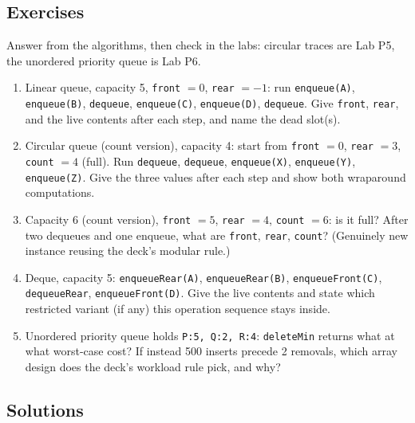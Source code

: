 \documentclass[11pt]{article}
\begin{document}
\subsection*{Exercises}

Answer from the algorithms, then check in the labs: circular traces are Lab P5, the unordered priority queue is Lab P6.
\begin{enumerate}
  \item Linear queue, capacity 5, \texttt{front} $= 0$, \texttt{rear} $= -1$: run \texttt{enqueue(A)}, \texttt{enqueue(B)}, \texttt{dequeue}, \texttt{enqueue(C)}, \texttt{enqueue(D)}, \texttt{dequeue}. Give \texttt{front}, \texttt{rear}, and the live contents after each step, and name the dead slot(s).
  \item Circular queue (count version), capacity 4: start from \texttt{front} $= 0$, \texttt{rear} $= 3$, \texttt{count} $= 4$ (full). Run \texttt{dequeue}, \texttt{dequeue}, \texttt{enqueue(X)}, \texttt{enqueue(Y)}, \texttt{enqueue(Z)}. Give the three values after each step and show both wraparound computations.
  \item Capacity 6 (count version), \texttt{front} $= 5$, \texttt{rear} $= 4$, \texttt{count} $= 6$: is it full? After two dequeues and one enqueue, what are \texttt{front}, \texttt{rear}, \texttt{count}? (Genuinely new instance reusing the deck's modular rule.)
  \item Deque, capacity 5: \texttt{enqueueRear(A)}, \texttt{enqueueRear(B)}, \texttt{enqueueFront(C)}, \texttt{dequeueRear}, \texttt{enqueueFront(D)}. Give the live contents and state which restricted variant (if any) this operation sequence stays inside.
  \item Unordered priority queue holds \texttt{P:5, Q:2, R:4}: \texttt{deleteMin} returns what at what worst-case cost? If instead 500 inserts precede 2 removals, which array design does the deck's workload rule pick, and why?
\end{enumerate}

\subsection*{Solutions}
\end{document}
